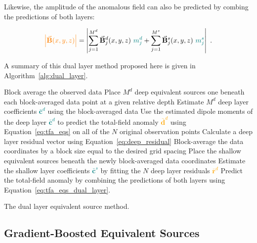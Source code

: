 \noindent
Likewise, the amplitude of the anomalous field can also be predicted by combing the predictions of both layers:

\begin{equation}
  \textcolor{orange}{\left\lvert \vec{\mathbf{B}}(x,y,z) \right\rvert} = 
  \left\lvert \sum_{j=1}^{M^d} \vec{\mathbf{B}}^d_{j}(x,y,z)\ \textcolor{teal}{m^d_j}
  +
  \sum_{j=1}^{M^s}  \vec{\mathbf{B}}^s_{j}(x,y,z)\ \textcolor{teal}{m^s_j}
  \right\rvert
  \ .
\end{equation}

A summary of this dual layer method proposed here is given in Algorithm~\ref{alg:dual_layer}.

\begin{algorithm}[!h]
  Block average the observed data
  \;
  Place $M^d$ deep equivalent sources one beneath each block-averaged data point at a given relative depth
  \;
  Estimate $M^d$ deep layer coefficients \textcolor{teal}{$\bar{\mathbf{c}}^d$} using the block-averaged data 
  \;
  Use the estimated dipole moments of the deep layer \textcolor{teal}{$\bar{\mathbf{c}}^d$} to predict the total-field anomaly \textcolor{orange}{$\bar{\mathbf{d}}^d$} using Equation~\ref{eq:tfa_eqs} on all of the $N$ original observation points
  \;
  Calculate a deep layer residual vector using Equation~\ref{eq:deep_residual}
  \;
  Block-average the data coordinates by a block size equal to the desired grid spacing
  \;
  Place the shallow equivalent sources beneath the newly block-averaged data coordinates
  \;
  Estimate the shallow layer coefficients \textcolor{teal}{$\bar{\mathbf{c}}^s$} by fitting the $N$ deep layer residuals \textcolor{orange}{$\bar{\mathbf{r}}^d$}
  \;
   Predict the total-field anomaly by combining the predictions of both layers using Equation~\ref{eq:tfa_eqs_dual_layer}.
  \BlankLine
  \caption{The dual layer equivalent source method.}
  \label{alg:dual_layer}
\end{algorithm}


\subsection{Gradient-Boosted Equivalent Sources}

